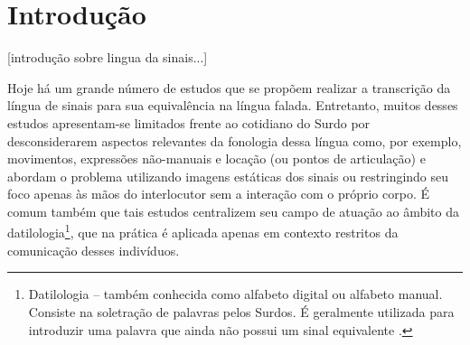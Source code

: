 

\maketitle
\begin{abstract}
Este trabalho propõe a aplicação de um modelo de aprendizagem profunda baseado em grafos, conhecido como Rede Convolucional de Grafos Espaço-Temporais, para o reconhecimento de sinais da língua sinalizada. Trata-se de uma abordagem centrada no movimento do corpo humano, o qual é capturado no espaço e no tempo e representado na forma de grafos, que são posteriormente aprendidos automaticamente pelo modelo.
\end{abstract}



\section{Introdução} %
\label{sec:introducao}
[introdução sobre lingua da sinais...]

Hoje há um grande número de estudos que se propõem realizar a transcrição da língua de sinais para sua equivalência na língua falada. Entretanto, muitos desses estudos apresentam-se limitados frente ao cotidiano do Surdo por desconsiderarem aspectos relevantes da fonologia dessa língua como, por exemplo, movimentos, expressões não-manuais e locação (ou pontos de articulação) \cite{quadros-2004} e abordam o problema utilizando imagens estáticas dos sinais ou restringindo seu foco apenas às mãos do interlocutor sem a interação com o próprio corpo. É comum também que tais estudos centralizem seu campo de atuação ao âmbito da datilologia\footnote{
     Datilologia – também conhecida como alfabeto digital ou alfabeto manual. Consiste na soletração de palavras pelos Surdos. É geralmente utilizada para introduzir uma palavra que ainda não possui um sinal equivalente \cite{quadros-2004, pereira-choi-2011}.
}, que na prática é aplicada apenas em contexto restritos da comunicação desses indivíduos.

